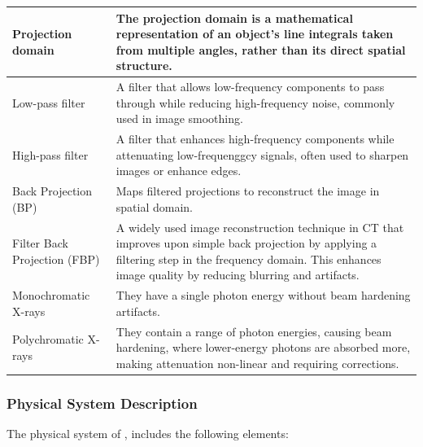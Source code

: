 \documentclass[12pt]{article}
\begin{document}
\begin{center}
\begin{longtable}{|l|p{10cm}|}
  Projection domain & The projection domain is a mathematical representation of an object's line integrals taken from multiple angles, rather than its direct spatial structure.\\
  \hline

  Low-pass filter & A filter that allows low-frequency components to pass through while reducing high-frequency noise, commonly used in image smoothing.\\
  \hline

  High-pass filter & A filter that enhances high-frequency components while attenuating low-frequenggcy signals, often used to sharpen images or enhance edges.\\
  \hline

  Back Projection (BP) & Maps filtered projections to reconstruct the image in spatial domain.\\
  \hline

  Filter Back Projection (FBP) & A widely used image reconstruction technique in CT that improves upon simple back projection by applying a filtering step in the frequency domain. This enhances image quality by reducing blurring and artifacts.\\
  \hline

  Monochromatic X-rays & They have a single photon energy without beam hardening artifacts.\\
  \hline

  Polychromatic X-rays & They contain a range of photon energies, causing beam hardening, where lower-energy photons are absorbed more, making attenuation non-linear and requiring corrections.\\
  \hline
\end{longtable}
\end{center}

\subsubsection{Physical System Description} \label{sec_phySystDescrip}
The physical system of \progname{}, includes the following elements:
\end{document}

